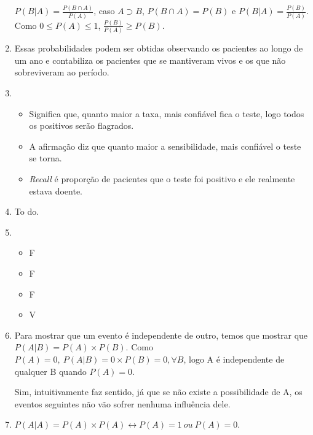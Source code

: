 \documentclass[11pt,a4paper]{book}
\begin{document}
\begin{enumerate}
		$P(B|A)=\frac{P(B \cap A)}{P(A)}$, caso $A \supset B$, $P(B \cap A) = P(B)$ e $P(B|A)=\frac{P(B)}{P(A)}$.
		Como $0 \leq P(A)\leq 1$, $\frac{P(B)}{P(A)} \geq P(B)$.
		
		\item Essas probabilidades podem ser obtidas observando os pacientes ao longo de um ano e contabiliza os pacientes que se mantiveram vivos e os que não sobreviveram ao período.
		
		\item 
			\begin{itemize}
				\item Significa que, quanto maior a taxa, mais confiável fica o teste, logo todos os positivos serão flagrados.
				\item A afirmação diz que quanto maior a sensibilidade, mais confiável o teste se torna.
				\item \textit{Recall} é proporção de pacientes que o teste foi positivo e ele realmente estava doente.
			\end{itemize}
		\item
			To do.
		\item
			\begin{itemize}
				\item F
				\item F
				\item F
				\item V
			\end{itemize}
		\item Para mostrar que um evento é independente de outro, temos que mostrar que $P(A|B)=P(A)\times P(B)$.
		Como $P(A)=0,~P(A|B)=0\times P(B)=0, \forall B$, logo A é independente de qualquer B quando $P(A)=0$.
		
		Sim, intuitivamente faz sentido, já que se não existe a possibilidade de A, os eventos seguintes não vão sofrer nenhuma influência dele.
		
		\item $P(A|A)=P(A)\times P(A) \longleftrightarrow P(A)=1~ou~P(A)=0$.
	\end{enumerate}
\end{document}
